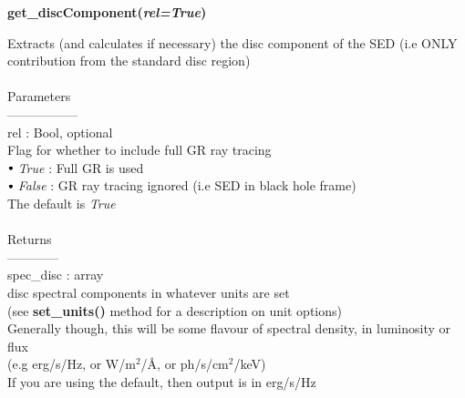 \documentclass[a4paper, 11pt, times, onecolumn]{article}
\newcommand{\sbt}{\,\begin{picture}(-1,1)(-1,-3)\circle*{3}\end{picture}\ }
\begin{document}
\vspace{1cm}

\noindent
{\bf get\_discComponent(\textit{rel=True})}
\begin{adjustwidth}{1.5cm}{}

	\noindent
	Extracts (and calculates if necessary) the disc component of the SED (i.e ONLY contribution from the standard disc region)
	\\~\\
	Parameters\\
	-----------------\\
	\indent rel : Bool, optional \\
	\indent \indent Flag for whether to include full GR ray tracing \\
	\indent \indent \indent $\sbt$ {\it True} : Full GR is used \\
	\indent \indent \indent $\sbt$ {\it False} : GR ray tracing ignored (i.e SED in black hole frame) \\
	\indent \indent The default is {\it True}
	\\~\\
	Returns \\
	------------\\ 
	\indent spec\_disc : array \\
	\indent \indent disc spectral components in whatever units are set \\
	\indent \indent (see {\bf set\_units()} method for a description on unit options) \\
	\indent \indent Generally though, this will be some flavour of spectral density, in luminosity or flux \\
	\indent \indent  (e.g erg/s/Hz, or W/m$^{2}$/\AA,  or ph/s/cm$^{2}$/keV) \\
	\indent \indent If you are using the default, then output is in erg/s/Hz

\end{adjustwidth}

\vspace{1cm}
\end{document}
